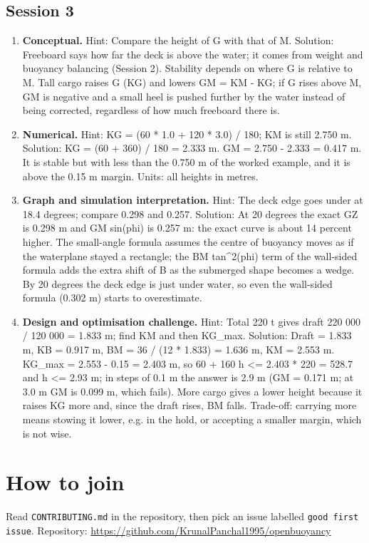 \documentclass[11pt,a4paper]{article}
\begin{document}
\subsection*{Session 3}
\begin{enumerate}[nosep]
\item \textbf{Conceptual.} Hint: Compare the height of G with that of M. Solution: Freeboard says how far the deck is above the water; it comes from weight and buoyancy balancing (Session 2). Stability depends on where G is relative to M. Tall cargo raises G (KG) and lowers GM = KM - KG; if G rises above M, GM is negative and a small heel is pushed further by the water instead of being corrected, regardless of how much freeboard there is.
\item \textbf{Numerical.} Hint: KG = (60 * 1.0 + 120 * 3.0) / 180; KM is still 2.750 m. Solution: KG = (60 + 360) / 180 = 2.333 m. GM = 2.750 - 2.333 = 0.417 m. It is stable but with less than the 0.750 m of the worked example, and it is above the 0.15 m margin. Units: all heights in metres.
\item \textbf{Graph and simulation interpretation.} Hint: The deck edge goes under at 18.4 degrees; compare 0.298 and 0.257. Solution: At 20 degrees the exact GZ is 0.298 m and GM sin(phi) is 0.257 m: the exact curve is about 14 percent higher. The small-angle formula assumes the centre of buoyancy moves as if the waterplane stayed a rectangle; the BM tan\textasciicircum{}2(phi) term of the wall-sided formula adds the extra shift of B as the submerged shape becomes a wedge. By 20 degrees the deck edge is just under water, so even the wall-sided formula (0.302 m) starts to overestimate.
\item \textbf{Design and optimisation challenge.} Hint: Total 220 t gives draft 220 000 / 120 000 = 1.833 m; find KM and then KG\_max. Solution: Draft = 1.833 m, KB = 0.917 m, BM = 36 / (12 * 1.833) = 1.636 m, KM = 2.553 m. KG\_max = 2.553 - 0.15 = 2.403 m, so 60 + 160 h \textless{}= 2.403 * 220 = 528.7 and h \textless{}= 2.93 m; in steps of 0.1 m the answer is 2.9 m (GM = 0.171 m; at 3.0 m GM is 0.099 m, which fails). More cargo gives a lower height because it raises KG more and, since the draft rises, BM falls. Trade-off: carrying more means stowing it lower, e.g. in the hold, or accepting a smaller margin, which is not wise.
\end{enumerate}

\section{How to join}
Read \texttt{CONTRIBUTING.md} in the repository, then pick an issue labelled \texttt{good first issue}. Repository: \url{https://github.com/KrunalPanchal1995/openbuoyancy}
\end{document}
